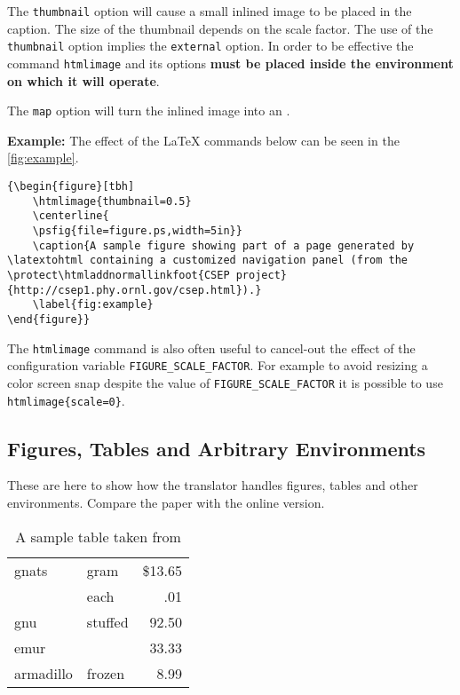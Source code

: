 The {\tt thumbnail} option will cause a small inlined image to be 
placed in the caption. The size of the thumbnail depends on the
scale factor. The use of the {\tt thumbnail} option implies
the {\tt external} option. In order to be effective the command
{\tt htmlimage} and its options {\bf must be placed inside the
environment on which it will operate}.

The {\tt map} option will turn the inlined image into an 
.

{\bf Example:}
The effect of the LaTeX commands below can be seen in the
 \ref{fig:example}.
\begin{small}
\begin{verbatim}
{\begin{figure}[tbh]
    \htmlimage{thumbnail=0.5}
    \centerline{
    \psfig{file=figure.ps,width=5in}}
    \caption{A sample figure showing part of a page generated by
\latextohtml containing a customized navigation panel (from the
\protect\htmladdnormallinkfoot{CSEP project}
{http://csep1.phy.ornl.gov/csep.html}).}
    \label{fig:example}
\end{figure}}
\end{verbatim}
\end{small}

The {\tt htmlimage} command is also often useful to cancel-out the
effect of the configuration variable {\tt FIGURE\_SCALE\_FACTOR}.
For example to avoid resizing a color screen snap despite 
the value of {\tt FIGURE\_SCALE\_FACTOR} it is possible to 
use {\tt htmlimage\{scale=0\}}.

\subsection{Figures, Tables and Arbitrary Environments}
 These are here to show how the translator
handles figures, tables
and other environments. Compare the paper with the online version.

\begin{table}[h]
\begin{center}
\begin{tabular}{||l|lr||}   \hline
gnats	&	gram	&	\$13.65  \\ \cline{2-3}
	&	each	&        .01	\\ \hline
gnu	& 	stuffed	&        92.50  
                \\  \cline{1-1} \cline{3-3}
emur	&		&	33.33   \\ \hline
armadillo	& frozen	&	8.99 \\ \hline
\end{tabular}
\end{center}
\caption{A sample table taken from \protect\cite{lamp:latex}}
\label{tab}
\end{table}

